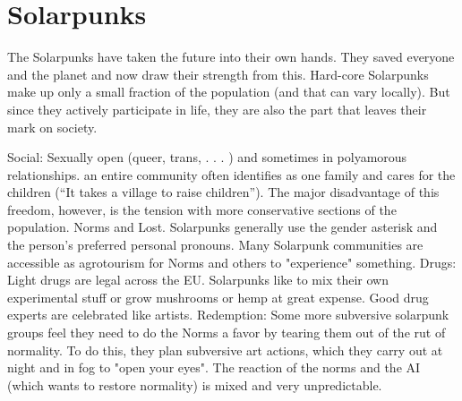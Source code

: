 \section{Solarpunks}

The Solarpunks have taken the future into their own hands. They saved everyone and the planet and now draw their strength from this.
Hard-core Solarpunks make up only a small fraction of the population (and that can vary locally). But since they actively participate in life, they are also the part that leaves their mark on society.

Social: Sexually open (queer, trans, . . . ) and sometimes in polyamorous relationships. an entire community often identifies as one family and cares for the children (“It takes a village to raise children”).
The major disadvantage of this freedom, however, is the tension with more conservative sections of the population. Norms and Lost. Solarpunks generally use the gender asterisk and the person's preferred personal pronouns. Many Solarpunk communities are accessible as agrotourism for Norms and others to "experience" something.
Drugs: Light drugs are legal across the EU. Solarpunks like to mix their own experimental stuff or grow mushrooms or hemp at great expense. Good drug experts are celebrated like artists.
Redemption: Some more subversive solarpunk groups feel they need to do the Norms a favor by tearing them out of the rut of normality. To do this, they plan subversive art actions, which they carry out at night and in fog to "open your eyes". The reaction of the norms and the AI (which wants to restore normality) is mixed and very unpredictable.

